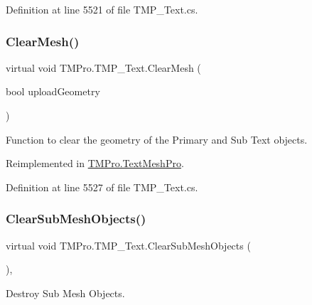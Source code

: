 Definition at line 5521 of file T\+M\+P\+\_\+\+Text.\+cs.

\mbox{\label{class_t_m_pro_1_1_t_m_p___text_af3f756ddaf2d3f82ddddb27b6f66a15f}} 
\subsubsection{\texorpdfstring{ClearMesh()}{ClearMesh()}\hspace{0.1cm}{\footnotesize\ttfamily [2/2]}}
{\footnotesize\ttfamily virtual void T\+M\+Pro.\+T\+M\+P\+\_\+\+Text.\+Clear\+Mesh (\begin{DoxyParamCaption}\item[{bool}]{upload\+Geometry }\end{DoxyParamCaption})\hspace{0.3cm}{\ttfamily [virtual]}}



Function to clear the geometry of the Primary and Sub Text objects. 



Reimplemented in \mbox{\hyperlink{class_t_m_pro_1_1_text_mesh_pro_ae306e084f9bdd5f374e9168d00fa0d17}{T\+M\+Pro.\+Text\+Mesh\+Pro}}.



Definition at line 5527 of file T\+M\+P\+\_\+\+Text.\+cs.

\mbox{\label{class_t_m_pro_1_1_t_m_p___text_a837eac6133a6ef0cdceb26db59c6ac19}} 
\subsubsection{\texorpdfstring{ClearSubMeshObjects()}{ClearSubMeshObjects()}}
{\footnotesize\ttfamily virtual void T\+M\+Pro.\+T\+M\+P\+\_\+\+Text.\+Clear\+Sub\+Mesh\+Objects (\begin{DoxyParamCaption}{ }\end{DoxyParamCaption})\hspace{0.3cm}{\ttfamily [protected]}, {\ttfamily [virtual]}}



Destroy Sub Mesh Objects. 



